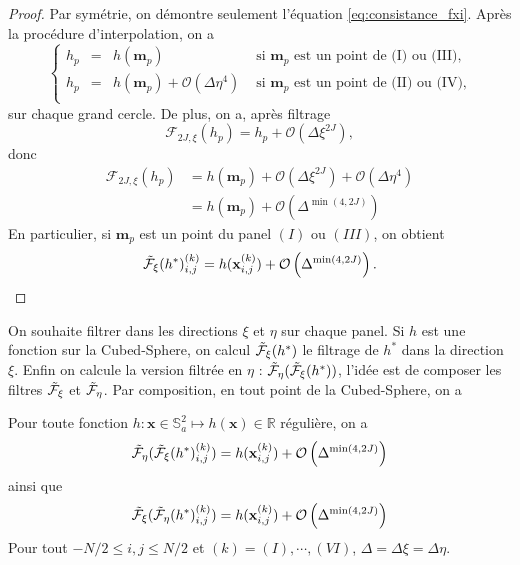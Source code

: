 \begin{proof}
Par symétrie, on démontre seulement l'équation \eqref{eq:consistance_fxi}.
Après la procédure d'interpolation, on a 
\begin{equation}
\left\lbrace
\begin{array}{rccl}
h_p & = & h(\mathbf{m}_p) & \text{ si } \mathbf{m}_p \text{ est un point de (I) ou (III),} \\ 
h_p & = & h(\mathbf{m}_p) + \mathcal{O}(\Delta \eta^4) & \text{ si } \mathbf{m}_p \text{ est un point de (II) ou (IV),} \\ 
\end{array}
\right.
\end{equation} 
sur chaque grand cercle. De plus, on a, après filtrage
\begin{equation}
\mathcal{F}_{2J,\xi}(h_p) = h_p + \mathcal{O}(\Delta \xi^{2J}),
\end{equation}
donc
\begin{align*}
\mathcal{F}_{2J,\xi}(h_p) & = h(\mathbf{m}_p) + \mathcal{O}(\Delta \xi^{2J}) + \mathcal{O}(\Delta \eta^4) \\
	& = h(\mathbf{m}_p) + \mathcal{O}\left( \Delta^{\min(4,2J)} \right)
\end{align*}
En particulier, si $\mathbf{m}_p$ est un point du panel $(I)$ ou $(III)$, on obtient
\begin{equation}
\tilde{\mathcal{F}}_{\xi}(h^*)_{i,j}^{(k)} = h(\mathbf{x}_{i,j}^{(k)}) + \mathcal{O}\left( \Delta^{\min(4,2J)} \right).
\end{equation}
\end{proof}

On souhaite filtrer dans les directions $\xi$ et $\eta$ sur chaque panel. Si $h$ est une fonction sur la Cubed-Sphere, on calcul $\tilde{\mathcal{F}}_{\xi}(h^*)$ le filtrage de $h^*$ dans la direction $\xi$. Enfin on calcule la version filtrée en $\eta$ : $\tilde{\mathcal{F}}_{\eta}( \tilde{\mathcal{F}}_{\xi}(h^*))$, l'idée est de composer les filtres $\tilde{\mathcal{F}}_{\xi}$ et $\tilde{\mathcal{F}}_{\eta}$. Par composition, en tout point de la Cubed-Sphere, on a 

\begin{proposition}
Pour toute fonction $h : \mathbf{x} \in \mathbb{S}_a^2 \mapsto h(\mathbf{x}) \in \mathbb{R}$ régulière, on a 
\begin{equation}
\tilde{\mathcal{F}}_{\eta}(\tilde{\mathcal{F}}_{\xi}(h^*)_{i,j}^{(k)}) = h(\mathbf{x}_{i,j}^{(k)}) + \mathcal{O}\left( \Delta^{\min(4,2J)} \right)
\label{eq:consistance_ftretaxi_comp}
\end{equation}
ainsi que
\begin{equation}
\tilde{\mathcal{F}}_{\xi}(\tilde{\mathcal{F}}_{\eta}(h^*)_{i,j}^{(k)}) = h(\mathbf{x}_{i,j}^{(k)}) + \mathcal{O}\left( \Delta^{\min(4,2J)} \right)
\label{eq:consistance_ftrxieta_comp}
\end{equation}
Pour tout $-N/2 \leq i,j \leq N/2$ et $(k) = (I), \cdots , (VI)$, $\Delta = \Delta \xi = \Delta \eta$.
\label{prop:consistance_ftrxieta_comp}
\end{proposition}


